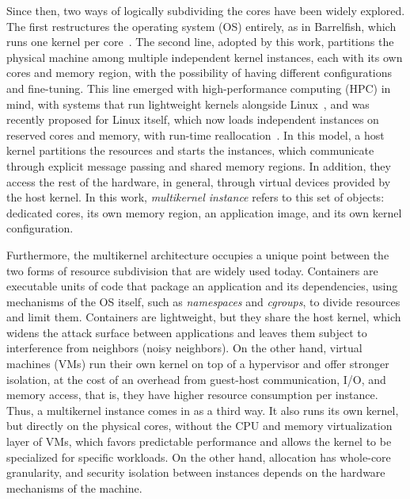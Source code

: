 \documentclass[12pt]{article}
\begin{document}
Since then, two ways of logically subdividing the cores have been widely explored.
The first restructures the operating system (OS) entirely, as in Barrelfish, which runs one kernel per core~\cite{baumann2009multikernel}.
The second line, adopted by this work, partitions the physical machine
among multiple independent kernel instances, each with its own cores and memory region,
with the possibility of having different configurations and fine-tuning.
This line emerged with high-performance computing (HPC) in mind, with systems that run lightweight kernels alongside Linux~\cite{shimosawa2014ihk,park2012fusedos,gerofi2016survey},
and was recently proposed for Linux itself, which now loads independent instances on reserved cores and memory, with run-time
reallocation~\cite{wang2025multikernel,wang2025lpc}.
In this model, a host kernel partitions the resources and starts the
instances, which communicate through explicit message passing and shared memory regions.
In addition, they access the rest of the hardware, in general, through virtual devices provided by the host kernel.
In this work, \textit{multikernel instance} refers to this set of objects: dedicated cores, its own memory region,
an application image, and its own kernel configuration.

Furthermore, the multikernel architecture occupies a unique point between the two forms of resource subdivision that are widely used today.
Containers are executable units of code that package an application and its dependencies, using mechanisms of the OS itself, such as \textit{namespaces} and \textit{cgroups},
to divide resources and limit them.
Containers are lightweight, but they share the host kernel, which widens the attack surface between
applications and leaves them subject to interference from neighbors (noisy neighbors).
On the other hand, virtual machines (VMs) run their own
kernel on top of a hypervisor and offer stronger isolation, at the cost of an overhead from guest-host communication,
I/O, and memory access, that is, they have higher resource consumption per instance.
Thus, a multikernel instance comes in as a third way.
It also runs its own kernel, but directly on the physical cores, without the CPU and memory virtualization layer of VMs, which favors
predictable performance and allows the kernel to be specialized for specific workloads.
On the other hand, allocation has whole-core granularity, and security isolation between instances depends on the
hardware mechanisms of the machine.
\end{document}
